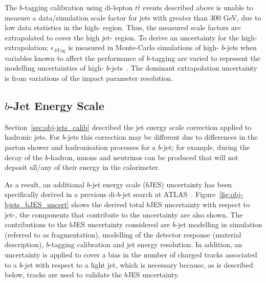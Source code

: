 The $b$-tagging calibration using di-lepton $t\bar{t}$ events described above
is unable to measure a data/simulation scale factor for jets with \pT{} greater than 300 GeV, due to low data statistics in the high-\pT{} region.
Thus, the measured scale factors are extrapolated to cover the high jet-\pT{} region.
To derive an uncertainty for the high-\pT{} extrapolation; $\epsilon_{\,b\text{Tag}}$ is measured in Monte-Carlo simulations of high-\pT{} $b$-jets  
when variables known to affect the performance of $b$-tagging are varied to represent the modelling uncertainties of high-\pT{} \mbox{$b$-jets}~\cite{obj-bjets_calib_highPt}.
The dominant extrapolation uncertainty is from variations of the impact parameter resolution.

\subsection{$b$-Jet Energy Scale}
\label{sec:obj-bjets_bjes}

Section~\ref{sec:obj-jets_calib} described the
jet energy scale correction applied to hadronic jets.
For $b$-jets this correction may be different due to differences in the parton shower and hadronisation processes for a $b$-jet;
for example, during the decay of the $b$-hadron, muons and neutrinos can be produced that will not deposit all/any of their energy in the calorimeter.

As a result, an additional $b$-jet energy scale ($b$JES) uncertainty has been 
specifically derived in a previous di-$b$-jet search at ATLAS~\cite{dibjet-mori16_paper}.
Figure~\ref{fig:obj-bjets_bJES_uncert} shows the derived total $b$JES uncertainty with respect to jet-\pT{},
the components that contribute to the uncertainty are also shown.
The contributions to the $b$JES uncertainty considered are $b$-jet modelling in simulation (referred to as fragmentation),
modelling of the detector response (material description), $b$-tagging calibration and jet energy resolution.
In addition, an uncertainty is applied to cover a bias in the number of charged tracks associated to a $b$-jet with respect to a light jet,
which is necessary because, as is described below, tracks are used to validate the $b$JES uncertainty.

